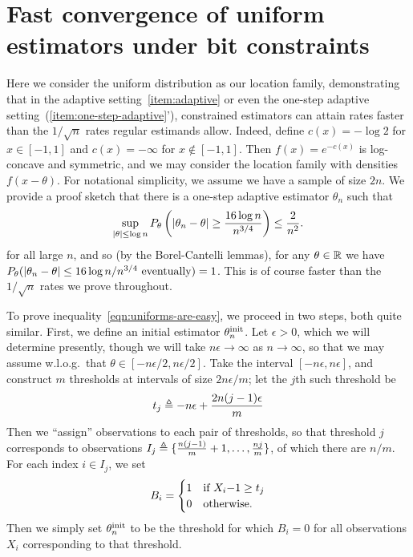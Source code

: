 
\section{Fast convergence of uniform estimators under bit constraints}
\label{sec:uniform-weirdos}

Here we consider the uniform distribution as our location family,
demonstrating that in the adaptive setting~\eqref{item:adaptive} or even the
one-step adaptive setting~(\ref{item:one-step-adaptive}'), constrained
estimators can attain rates faster than the $1 / \sqrt{n}$ rates regular
estimands allow. Indeed, define $c(x) = -\log 2$ for $x \in [-1, 1]$ and
$c(x) = -\infty$ for $x \not \in [-1, 1]$. Then $f(x) = e^{-c(x)}$ is
log-concave and symmetric, and we may consider the location family with
densities $f(x - \theta)$. For notational simplicity, we assume we have
a sample of size $2n$. We provide a proof sketch that
there is a one-step adaptive estimator $\theta_n$ such that
\begin{equation}
  \label{eqn:uniforms-are-easy}
  \sup_{|\theta| \le \log n}
  P_\theta\left(|\theta_n - \theta| \ge \frac{{\color{black} {16}} \log n}{n^{3/4}}\right)
  \le \frac{2}{n^2}.
\end{equation}
for all large $n$,
and so (by the Borel-Cantelli lemmas), for any $\theta \in \mathbb{R}$ we have
$P_\theta(|\theta_n - \theta| \le {\color{black} {16 \log n}} / n^{3/4} ~
\mbox{eventually}) = 1$. This is of course faster than the $1/\sqrt{n}$
rates we prove throughout.

To prove inequality~\eqref{eqn:uniforms-are-easy}, we proceed in two steps,
both quite similar.
First, we define an initial estimator $\theta^{\textup{init}}_n$.
Let $\epsilon > 0$, which we will determine presently, though we will
take $n \epsilon \to \infty$ as $n \to \infty$, so that we may assume
w.l.o.g.\ that $\theta \in [-n\epsilon/2, n \epsilon/2]$. Take the interval
$[-n\epsilon, n\epsilon]$, and construct
$m$ thresholds at intervals of size $2 n \epsilon / m$; let
the $j$th such threshold be
\begin{equation*}
  t_j \triangleq -n \epsilon + \frac{2 n (j-1) \epsilon}{m}
\end{equation*}
Then we ``assign'' observations to each pair of thresholds, so that
threshold $j$ corresponds to observations $I_j \triangleq \{\frac{n (j - 1)}{m}
+ 1, \ldots, \frac{n j}{m}\}$, of which there are $n/m$. For each index $i
\in I_j$, we set
\begin{equation*}
  B_i = \begin{cases}
    1 & \mbox{if~} X_i {\color{black} {- 1}} \ge t_j \\
    0 & \mbox{otherwise}.
  \end{cases}
\end{equation*}
Then we simply set $\theta^{\textup{init}}_n$ to be the  threshold for which
$B_i = 0$ for all observations $X_i$ corresponding to that threshold. 

